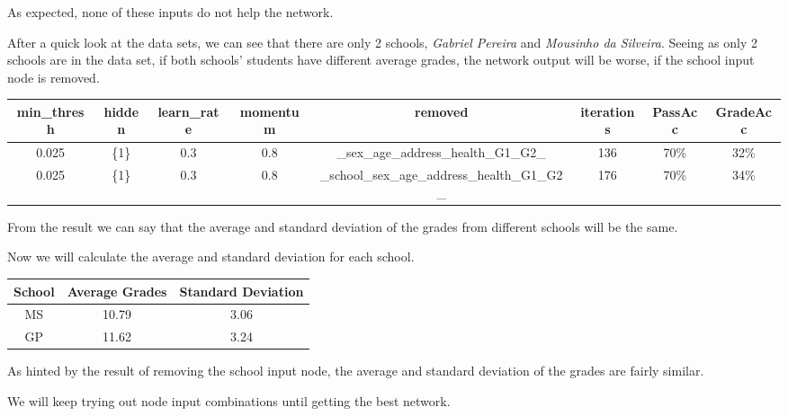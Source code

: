 \documentclass[11pt]{article}
\begin{document}
As expected, none of these inputs do not help the network.
\hfill \break
\hfill \break

After a quick look at the data sets, we can see that there are only 2 schools, \textit{Gabriel Pereira} and \textit{Mousinho da Silveira}. Seeing as only 2 schools are in the data set, if both schools' students have different average grades, the network output will be worse, if the school input node is removed.

\begin{tabular}{| c | c | c | c | c | c | c | c |}
\hline \textbf{min\_thresh} & \textbf{hidden} & \textbf{learn\_rate} & \textbf{momentum} & \textbf{removed} & \textbf{iterations} & \textbf{PassAcc} & \textbf{GradeAcc}\\
\hline 0.025 & \{1\} & 0.3 & 0.8 & \_sex\_age\_address\_health\_G1\_G2\_ & 136 & 70\% & 32\%\\
\hline 0.025 & \{1\} & 0.3 & 0.8 & \_school\_sex\_age\_address\_health\_G1\_G2\_ & 176 & 70\% & 34\%\\
\hline
\end{tabular}

From the result we can say that the average and standard deviation of the grades from different schools will be the same.

Now we will calculate the average and standard deviation for each school.

\begin{tabular}{| c | c | c |}
\hline \textbf{School} & \textbf{Average Grades} & \textbf{Standard Deviation}\\
\hline MS & 10.79 & 3.06\\
\hline GP & 11.62 & 3.24\\
\hline
\end{tabular}
As hinted by the result of removing the school input node, the average and standard deviation of the grades are fairly similar.

We will keep trying out node input combinations until getting the best network.
\end{document}
